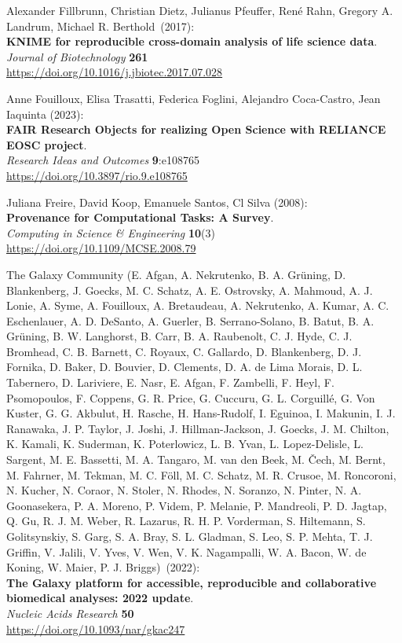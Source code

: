 \begin{thebibliography}{9}
Alexander Fillbrunn, Christian Dietz, Julianus Pfeuffer, René
Rahn, Gregory A. Landrum, Michael R. Berthold~(2017):\\
\textbf{KNIME for reproducible cross-domain analysis of life science
data}.\\
\emph{Journal of Biotechnology} \textbf{261}\\
\url{https://doi.org/10.1016/j.jbiotec.2017.07.028}

Anne Fouilloux, Elisa Trasatti, Federica Foglini, Alejandro Coca-Castro, Jean Iaquinta (2023):\\
\textbf{FAIR Research Objects for realizing Open Science with RELIANCE EOSC project}.\\
\emph{Research Ideas and Outcomes} \textbf{9}:e108765 \\
\url{https://doi.org/10.3897/rio.9.e108765}

Juliana Freire, David Koop, Emanuele Santos, Cl Silva (2008):\\
\textbf{Provenance for Computational Tasks: A Survey}.\\
\emph{Computing in Science \& Engineering} \textbf{10}(3) \\
\url{https://doi.org/10.1109/MCSE.2008.79}

The Galaxy Community (E. Afgan, A. Nekrutenko, B. A.
Grüning, D. Blankenberg, J. Goecks, M. C. Schatz, A. E. Ostrovsky, A.
Mahmoud, A. J. Lonie, A. Syme, A. Fouilloux, A. Bretaudeau, A.
Nekrutenko, A. Kumar, A. C. Eschenlauer, A. D. DeSanto, A. Guerler, B.
Serrano-Solano, B. Batut, B. A. Grüning, B. W. Langhorst, B. Carr, B. A.
Raubenolt, C. J. Hyde, C. J. Bromhead, C. B. Barnett, C. Royaux, C.
Gallardo, D. Blankenberg, D. J. Fornika, D. Baker, D. Bouvier, D.
Clements, D. A. de Lima Morais, D. L. Tabernero, D. Lariviere, E. Nasr,
E. Afgan, F. Zambelli, F. Heyl, F. Psomopoulos, F. Coppens, G. R. Price,
G. Cuccuru, G. L. Corguillé, G. Von Kuster, G. G. Akbulut, H. Rasche, H.
Hans-Rudolf, I. Eguinoa, I. Makunin, I. J. Ranawaka, J. P. Taylor, J.
Joshi, J. Hillman-Jackson, J. Goecks, J. M. Chilton, K. Kamali, K.
Suderman, K. Poterlowicz, L. B. Yvan, L. Lopez-Delisle, L. Sargent, M.
E. Bassetti, M. A. Tangaro, M. van den Beek, M. Čech, M. Bernt, M.
Fahrner, M. Tekman, M. C. Föll, M. C. Schatz, M. R. Crusoe, M.
Roncoroni, N. Kucher, N. Coraor, N. Stoler, N. Rhodes, N. Soranzo, N.
Pinter, N. A. Goonasekera, P. A. Moreno, P. Videm, P. Melanie, P.
Mandreoli, P. D. Jagtap, Q. Gu, R. J. M. Weber, R. Lazarus, R. H. P.
Vorderman, S. Hiltemann, S. Golitsynskiy, S. Garg, S. A. Bray, S. L.
Gladman, S. Leo, S. P. Mehta, T. J. Griffin, V. Jalili, V. Yves, V. Wen,
V. K. Nagampalli, W. A. Bacon, W. de Koning, W. Maier, P. J. Briggs)~(2022):\\
\textbf{The Galaxy platform for accessible, reproducible and
collaborative biomedical analyses: 2022 update}.\\
\emph{Nucleic Acids Research} \textbf{50}\\
\url{https://doi.org/10.1093/nar/gkac247}


\end{thebibliography}
